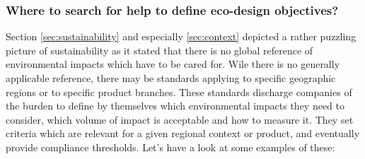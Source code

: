 \documentclass{article}
\begin{document}
\subsubsection{Where to search for help to define eco-design objectives?}
\label{sec:standards}
Section \ref{sec:sustainability} and especially \ref{sec:context} depicted a rather puzzling picture of sustainability as it stated that there is no global reference of environmental impacts which have to be cared for. Wile there is no generally applicable reference, there may be standards applying to specific geographic regions or to specific product branches. These standards discharge companies of the burden to define by themselves which environmental impacts they need to consider, which volume of impact is acceptable and how to measure it. They set criteria which are relevant for a given regional context or product, and eventually provide compliance thresholds. Let's have a look at some examples of these:
\end{document}
